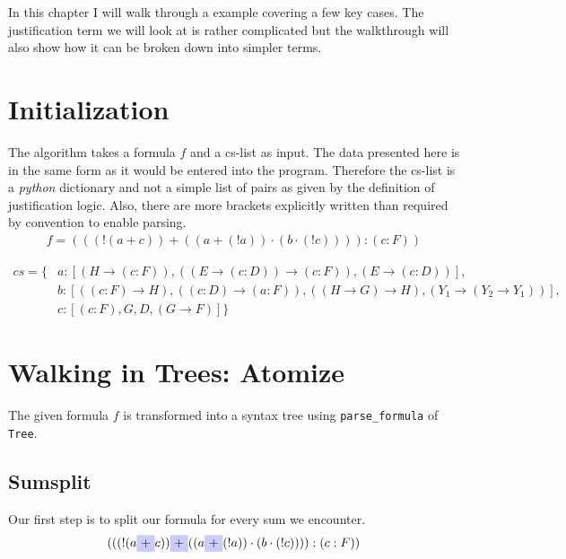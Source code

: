In this chapter I will walk through a example covering a few key cases. The justification term we will look at is rather complicated but the walkthrough will also show how it can be broken down into simpler terms.

\section{Initialization}
The algorithm takes a formula $f$ and a cs-list as input. The data presented here is in the same form as it would be entered into the program. Therefore the cs-list is a \emph{python} dictionary and not a simple list of pairs as given by the definition of justification logic. Also, there are more brackets explicitly written than required by convention to enable parsing.
\begin{align}\label{eq:f}
f = (((!(a+c))+((a+(!a))\cdot (b\cdot (!c)))):(c:F))
\end{align}

\begin{equation}\label{cs}
\begin{split}
	cs = \{& a: [(H \rightarrow (c:F)), ((E \rightarrow (c:D)) \rightarrow (c:F)), (E \rightarrow (c:D))],\\
	& b: [((c:F) \rightarrow H), ((c:D) \rightarrow (a:F)), ((H \rightarrow G) \rightarrow H), (Y_1 \rightarrow (Y_2 \rightarrow Y_1))],\\
	& c: [(c:F), G, D, (G \rightarrow F)]\}
\end{split}
\end{equation}

\section{Walking in Trees: Atomize}

The given formula $f$ is transformed into a syntax tree using \texttt{parse\_formula} of \texttt{Tree}. 

\subsection{Sumsplit}
Our first step is to split our formula for every sum we encounter.
\begin{equation*}
	(((!(a
    \tikz[baseline]{\node[fill=blue!20,anchor=base] (t1){$+$};} c))
    \tikz[baseline]{\node[fill=blue!20,anchor=base] (t2){$+$};} ((a
    \tikz[baseline]{\node[fill=blue!20,anchor=base] (t3){$+$};} (!a))\cdot (b\cdot (!c)))):(c:F))
\end{equation*}

